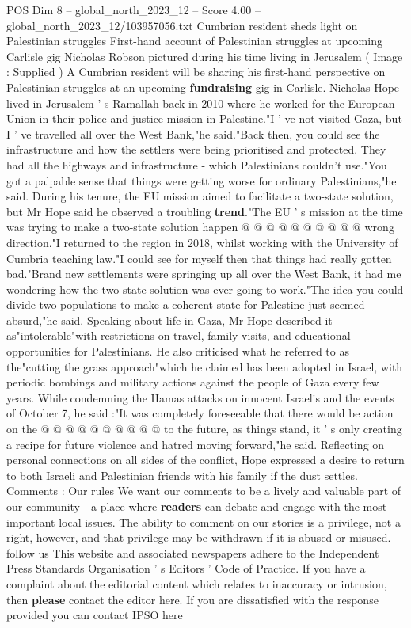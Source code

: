 \begin{textsample}{POS Dim 8 – global\_north\_2023\_12 – Score 4.00 – global\_north\_2023\_12/103957056.txt}  \label{ex:f8_pos_275}
Cumbrian resident sheds light on Palestinian struggles First-hand account of Palestinian struggles at upcoming Carlisle gig Nicholas Robson pictured during his time living in Jerusalem ( Image : Supplied ) A Cumbrian resident will be sharing his first-hand perspective on Palestinian struggles at an upcoming \textbf{fundraising} gig in Carlisle.
Nicholas Hope lived in Jerusalem ' s Ramallah back in 2010 where he worked for the European Union in their police and justice mission in Palestine."I ' ve not visited Gaza, but I ' ve travelled all over the West Bank,"he said."Back then, you could see the infrastructure and how the settlers were being prioritised and protected.
They had all the highways and infrastructure - which Palestinians couldn't use."You got a palpable sense that things were getting worse for ordinary Palestinians,"he said.
During his tenure, the EU mission aimed to facilitate a two-state solution, but Mr Hope said he observed a troubling \textbf{trend}."The EU ' s mission at the time was trying to make a two-state solution happen @ @ @ @ @ @ @ @ @ @ wrong direction."I returned to the region in 2018, whilst working with the University of Cumbria teaching law."I could see for myself then that things had really gotten bad."Brand new settlements were springing up all over the West Bank, it had me wondering how the two-state solution was ever going to work."The idea you could divide two populations to make a coherent state for Palestine just seemed absurd,"he said.
Speaking about life in Gaza, Mr Hope described it as"intolerable"with restrictions on travel, family visits, and educational opportunities for Palestinians.
He also criticised what he referred to as the"cutting the grass approach"which he claimed has been adopted in Israel, with periodic bombings and military actions against the people of Gaza every few years.
While condemning the Hamas attacks on innocent Israelis and the events of October 7, he said :"It was completely foreseeable that there would be action on the @ @ @ @ @ @ @ @ @ @ to the future, as things stand, it ' s only creating a recipe for future violence and hatred moving forward,"he said.
Reflecting on personal connections on all sides of the conflict, Hope expressed a desire to return to both Israeli and Palestinian friends with his family if the dust settles.
Comments : Our rules We want our comments to be a lively and valuable part of our community - a place where \textbf{readers} can debate and engage with the most important local issues.
The ability to comment on our stories is a privilege, not a right, however, and that privilege may be withdrawn if it is abused or misused. follow us This website and associated newspapers adhere to the Independent Press Standards Organisation ' s Editors ' Code of Practice.
If you have a complaint about the editorial content which relates to inaccuracy or intrusion, then \textbf{please} contact the editor here.
If you are dissatisfied with the response provided you can contact IPSO here

\end{textsample}
